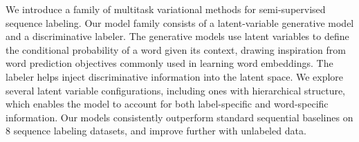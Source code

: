 We introduce a family of multitask variational methods for semi-supervised sequence labeling. Our model family consists of a latent-variable generative model and a discriminative labeler. The generative models use latent variables to define the conditional probability of a word given its context, drawing inspiration from word prediction objectives commonly used in learning word embeddings. The labeler helps inject discriminative information into the latent space. We explore several latent variable configurations, including ones with hierarchical structure, which enables the model to account for both  label-specific and word-specific information. Our models consistently outperform standard sequential baselines on 8 sequence labeling datasets, and improve further with unlabeled data.
